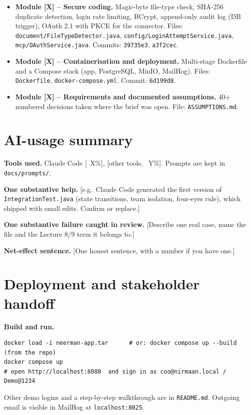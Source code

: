 \documentclass[11pt,a4paper]{article}
\begin{document}
\begin{itemize}[leftmargin=*,nosep]
    \item \textbf{Module [X] -- Secure coding.}
    Magic-byte file-type check, SHA-256 duplicate detection, login rate limiting, BCrypt, append-only audit log (DB trigger), OAuth 2.1 with PKCE for the connector.
    Files: \texttt{document/FileTypeDetector.java}, \texttt{config/LoginAttemptService.java}, \texttt{mcp/OAuthService.java}.
    Commits: \texttt{39735e3}, \texttt{a3f2cec}.

    \item \textbf{Module [X] -- Containerisation and deployment.}
    Multi-stage Dockerfile and a Compose stack (app, PostgreSQL, MinIO, MailHog).
    Files: \texttt{Dockerfile}, \texttt{docker-compose.yml}.
    Commit: \texttt{6d199d8}.

    \item \textbf{Module [X] -- Requirements and documented assumptions.}
    40+ numbered decisions taken where the brief was open.
    File: \texttt{ASSUMPTIONS.md}.
\end{itemize}

\section{AI-usage summary}

\textbf{Tools used.}
Claude Code [~X\%], [other tools, ~Y\%]. Prompts are kept in \texttt{docs/prompts/}.

\textbf{One substantive help.}
[e.g.\ Claude Code generated the first version of \texttt{IntegrationTest.java} (state transitions, team isolation, four-eyes rule), which shipped with small edits. Confirm or replace.]

\textbf{One substantive failure caught in review.}
[Describe one real case, name the file and the Lecture 8/9 term it belongs to.]

\textbf{Net-effect sentence.}
[One honest sentence, with a number if you have one.]

\section{Deployment and stakeholder handoff}

\textbf{Build and run.}
\begin{verbatim}
docker load -i neerman-app.tar      # or: docker compose up --build  (from the repo)
docker compose up
# open http://localhost:8080  and sign in as coo@nirmaan.local / Demo@1234
\end{verbatim}
Other demo logins and a step-by-step walkthrough are in \texttt{README.md}. Outgoing email is visible in MailHog at \texttt{localhost:8025}.
\end{document}
